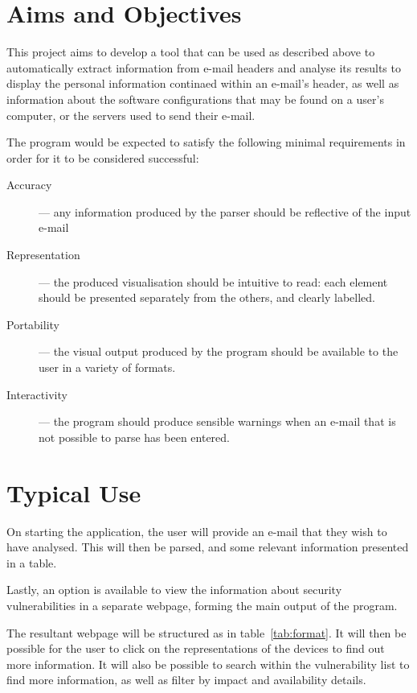 \documentclass[twoside,10pt]{scrreprt}
\begin{document}
    \section{Aims and Objectives}

    This project aims to develop a tool that can be used as described above to
    automatically extract information from e-mail headers and analyse its results to
    display the personal information continaed within an e-mail's header, as well as
    information about the software configurations that may be found on a user's
    computer, or the servers used to send their e-mail.

    The program would be expected to satisfy the following minimal requirements
    in order for it to be considered successful: \begin{description} \item
    [{Accuracy}] --- any information produced by the parser should be reflective
    of the input e-mail

    \item [{Representation}] --- the produced visualisation should be intuitive
    to read: each element should be presented separately from the others, and
    clearly labelled.

    \item [{Portability}] --- the visual output produced by the program should
    be available to the user in a variety of formats.

    \item [{Interactivity}] --- the program should produce sensible warnings
    when an e-mail that is not possible to parse has been entered.
  \end{description}

  \section{Typical Use}

  On starting the application, the user will provide an e-mail that they wish
  to have analysed.  This will then be parsed, and some relevant information
  presented in a table.

  Lastly, an option is available to view the information about security
  vulnerabilities in a separate webpage, forming the main output of the
  program.

  The resultant webpage will be structured as in table~\ref{tab:format}.  It
  will then be possible for the user to click on the representations of the
  devices to find out more information.  It will also be possible to search
  within the vulnerability list to find more information, as well as filter by
  impact and availability details.
\end{document}
